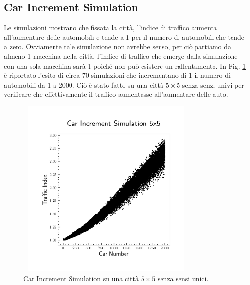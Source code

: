 \documentclass[main.tex]{subfiles}
\begin{document}
    
    \subsection{Car Increment Simulation}
        Le simulazioni mostrano che fissata la città, l'indice di traffico aumenta all'aumentare delle automobili
        e tende a 1 per il numero di automobili che tende a zero. Ovviamente tale simulazione non avrebbe senso, per ciò 
        partiamo da almeno 1 macchina nella città, l'indice di traffico che emerge dalla simulazione con una sola macchina
        sarà 1 poiché non può esistere un rallentamento.
        In Fig. \ref{fig:3} è riportato l'esito di circa 70 simulazioni che incrementano di 1 il numero di automobili da 1 a 2000.
        Ciò è stato fatto su una città $5 \times 5$ senza senzi univi per verificare che effettivamente il traffico aumentasse
        all'aumentare delle auto.
        \begin{figure}[H]
            \centering
            \includegraphics[width=9cm, height=9cm]{car_increment5x5.png}
            \caption{Car Increment Simulation su una città $5 \times 5$ senza sensi unici.}
            \label{fig:3}
        \end{figure}

        \newpage
\end{document}
